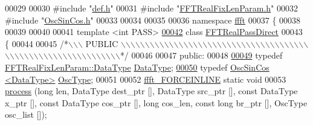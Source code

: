 \begin{DoxyCode}
00029 
00030 \textcolor{preprocessor}{#include    "\hyperlink{a00089}{def.h}"}
00031 \textcolor{preprocessor}{#include    "\hyperlink{a00099}{FFTRealFixLenParam.h}"}
00032 \textcolor{preprocessor}{#include    "\hyperlink{a00111}{OscSinCos.h}"}
00033 
00034 
00035 
00036 \textcolor{keyword}{namespace }\hyperlink{a00142}{ffft}
00037 \{
00038 
00039 
00040 
00041 \textcolor{keyword}{template} <\textcolor{keywordtype}{int} PASS>
\hypertarget{a00100_source_l00042}{}\hyperlink{a00013}{00042} \textcolor{keyword}{class }\hyperlink{a00013}{FFTRealPassDirect}
00043 \{
00044 
00045 \textcolor{comment}{/*\(\backslash\)\(\backslash\)\(\backslash\) PUBLIC \(\backslash\)\(\backslash\)\(\backslash\)\(\backslash\)\(\backslash\)\(\backslash\)\(\backslash\)\(\backslash\)\(\backslash\)\(\backslash\)\(\backslash\)\(\backslash\)\(\backslash\)\(\backslash\)\(\backslash\)\(\backslash\)\(\backslash\)\(\backslash\)\(\backslash\)\(\backslash\)\(\backslash\)\(\backslash\)\(\backslash\)\(\backslash\)\(\backslash\)\(\backslash\)\(\backslash\)\(\backslash\)\(\backslash\)\(\backslash\)\(\backslash\)\(\backslash\)\(\backslash\)\(\backslash\)\(\backslash\)\(\backslash\)\(\backslash\)\(\backslash\)\(\backslash\)\(\backslash\)\(\backslash\)\(\backslash\)\(\backslash\)\(\backslash\)\(\backslash\)\(\backslash\)\(\backslash\)\(\backslash\)\(\backslash\)\(\backslash\)\(\backslash\)\(\backslash\)\(\backslash\)\(\backslash\)\(\backslash\)\(\backslash\)\(\backslash\)\(\backslash\)\(\backslash\)\(\backslash\)\(\backslash\)\(\backslash\)\(\backslash\)*/}
00046 
00047 \textcolor{keyword}{public}:
00048 
\hypertarget{a00100_source_l00049}{}\hyperlink{a00013_a831663a8e0b1414e80f82cd3d18b5b6b}{00049}    \textcolor{keyword}{typedef}  \hyperlink{a00012_a119afb4512058be9d19dc6069cb3c19b}{FFTRealFixLenParam::DataType}    \hyperlink{a00013_a831663a8e0b1414e80f82cd3d18b5b6b}{DataType};
\hypertarget{a00100_source_l00050}{}\hyperlink{a00013_a8c8aa3a7ce0db9c2a3b2179007c6c4dd}{00050}     \textcolor{keyword}{typedef} \hyperlink{a00020}{OscSinCos <DataType>}    \hyperlink{a00013_a8c8aa3a7ce0db9c2a3b2179007c6c4dd}{OscType};
00051 
00052     \hyperlink{a00089_a31b2ada863c9efa7455efae4e13661f3}{ffft\_FORCEINLINE} \textcolor{keyword}{static} \textcolor{keywordtype}{void}
00053                         \hyperlink{a00013_a19e18210d065059938591fd5dfc31241}{process} (\textcolor{keywordtype}{long} len, DataType dest\_ptr [], DataType src\_ptr [], \textcolor{keyword}{const} DataType
       x\_ptr [], \textcolor{keyword}{const} DataType cos\_ptr [], \textcolor{keywordtype}{long} cos\_len, \textcolor{keyword}{const} \textcolor{keywordtype}{long} br\_ptr [], OscType osc\_list []);

\end{DoxyCode}
